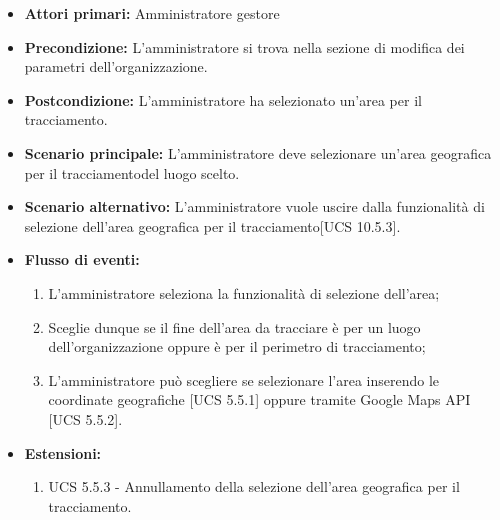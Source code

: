 \begin{itemize}
\item \textbf{Attori primari:} Amministratore gestore
\item \textbf{Precondizione:} L'amministratore si trova nella sezione di modifica dei parametri dell'organizzazione.
\item \textbf{Postcondizione:} L'amministratore ha selezionato un'area per il tracciamento.
\item \textbf{Scenario principale:} L'amministratore deve selezionare un'area geografica per il tracciamentodel luogo scelto.
\item \textbf{Scenario alternativo:} L'amministratore vuole uscire dalla funzionalità di selezione dell'area geografica per il tracciamento[UCS 10.5.3].
\item \textbf{Flusso di eventi:}
\begin{enumerate}
    \item L'amministratore seleziona la funzionalità di selezione dell'area;
    \item Sceglie dunque se il fine dell'area da tracciare è per un luogo dell'organizzazione oppure è per il perimetro di tracciamento;
    \item L'amministratore può scegliere se selezionare l'area inserendo le coordinate geografiche [UCS 5.5.1] oppure tramite Google Maps API [UCS 5.5.2].
\end{enumerate}
\item \textbf{Estensioni:}
\begin{enumerate}
    \item UCS 5.5.3 - Annullamento della selezione dell'area geografica per il tracciamento.
\end{enumerate}
\end{itemize}

